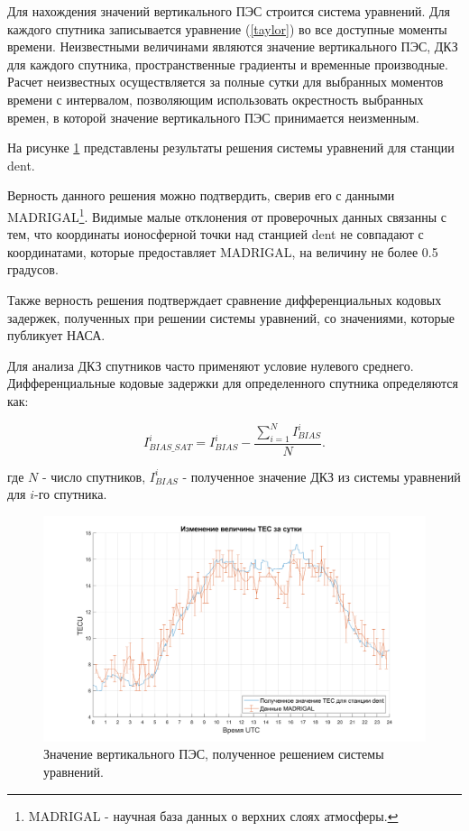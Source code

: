 \documentclass[a4paper]{article}
\begin{document}
Для нахождения значений вертикального ПЭС строится система уравнений. Для каждого спутника записывается уравнение (\ref{taylor}) во все доступные моменты времени. Неизвестными величинами являются значение вертикального ПЭС, ДКЗ для каждого спутника, пространственные градиенты и временные производные. Расчет неизвестных осуществляется за полные сутки для выбранных моментов времени с интервалом, позволяющим использовать окрестность выбранных времен, в которой значение вертикального ПЭС принимается неизменным.

На рисунке \ref{solvedtec} представлены результаты решения системы уравнений для станции dent.

Верность данного решения можно подтвердить, сверив его с данными MADRIGAL\footnote{MADRIGAL - научная база данных о верхних слоях атмосферы.}. Видимые малые отклонения от проверочных данных связанны с тем, что координаты ионосферной точки над станцией dent не совпадают с координатами, которые предоставляет MADRIGAL, на величину не более 0.5 градусов.   

Также верность решения подтверждает сравнение дифференциальных кодовых задержек, полученных при решении системы уравнений, со значениями, которые публикует НАСА.

Для анализа ДКЗ спутников часто применяют условие нулевого среднего. Дифференциальные кодовые задержки для определенного спутника определяются как:

\begin{equation}
I_{BIAS\_SAT}^i = I_{BIAS}^i - \frac{\sum_{i=1}^{N}I_{BIAS}^i}{N}.
\end{equation}

где $N$ - число спутников, $I_{BIAS}^i$ - полученное значение ДКЗ из системы уравнений для $i$-го спутника.

\begin{landscape}
\begin{figure}[h!]
\centering
\includegraphics[width = 1\linewidth]{pics/clean_pics/tec_madrigal.png}
\caption{Значение вертикального ПЭС, полученное решением системы уравнений.}
\label{solvedtec}
\end{figure}
\end{landscape}
\end{document}
